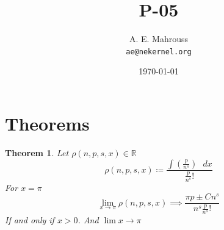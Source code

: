 \documentclass[11pt, a4paper]{article}
\title{P-05}
\author{A. E. Mahrouss\\\texttt{ae@nekernel.org}}
\date{\today}
\theoremstyle{plain}
\newtheorem{theorem}{Theorem}[section]
\theoremstyle{definition}
\theoremstyle{remark}
\begin{document}
\twocolumn[{%
  \maketitle
  \vspace{-0.5em}
  \vspace{0.8em}
  \rule{\linewidth}{0.4pt}
  \vspace{1em}
}]

\maketitle

\section{Theorems}
\begin{theorem}
Let $\rho(n, p, s, x) \in \mathbb{R}$
\begin{equation}
\rho(n, p, s, x) \coloneq \frac{\int (\frac{p}{n^{s}}) \text{ } dx}{\frac{p}{n^{s}}! }
\end{equation}
For $x = \pi$
\begin{equation}
  \lim_{x \to \pi} \rho(n, p, s, x) \implies \frac{\pi p\pm Cn^s}{n^s\frac{p}{n^s}!}
\end{equation}
If and only if $x > 0$. And $\lim x \to \pi$
\end{theorem}
\end{document}
